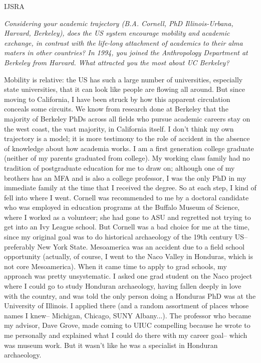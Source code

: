 \begin{labeling}{IJSRA}
\item[IJSRA] \emph{Considering your academic trajectory (B.A. Cornell, PhD Illinois-Urbana, Harvard, Berkeley), does the US system encourage mobility and academic exchange, in contrast with the life-long attachment of academics to their alma maters in other countries? In 1994, you joined the Anthropology Department at Berkeley from Harvard. What attracted you the most about UC Berkeley?}

\item[RAJ] Mobility is relative: the US has such a large number of universities, especially state universities, that it can look like people are flowing all around. But since moving to California, I have been struck by how this apparent circulation conceals some circuits. We know from research done at Berkeley that the majority of Berkeley PhDs across all fields who pursue academic careers stay on the west coast, the vast majority, in California itself. I don't think my own trajectory is a model; it is more testimony to the role of accident in the absence of knowledge about how academia works. I am a first generation college graduate (neither of my parents graduated from college). My working class family had no tradition of postgraduate education for me to draw on; although one of my brothers has an MFA and is also a college professor, I was the only PhD in my immediate family at the time that I received the degree. So at each step, I kind of fell into where I went. Cornell was recommended to me by a doctoral candidate who was employed in education programs at the Buffalo Museum of Science, where I worked as a volunteer; she had gone to ASU and regretted not trying to get into an Ivy League school. But Cornell was a bad choice for me at the time, since my original goal was to do historical archaeology of the 19th century US-- preferably New York State. Mesoamerica was an accident due to a field school opportunity (actually, of course, I went to the Naco Valley in Honduras, which is not core Mesoamerica). When it came time to apply to grad schools, my approach was pretty unsystematic. I asked one grad student on the Naco project where I could go to study Honduran archaeology, having fallen deeply in love with the country, and was told the only person doing a Honduras PhD was at the University of Illinois. I applied there (and a random assortment of places whose names I knew-- Michigan, Chicago, SUNY Albany...). The professor who became my advisor, Dave Grove, made coming to UIUC compelling because he wrote to me personally and explained what I could do there with my career goal-- which was museum work. But it wasn't like he was a specialist in Honduran archaeology.


\end{labeling}
